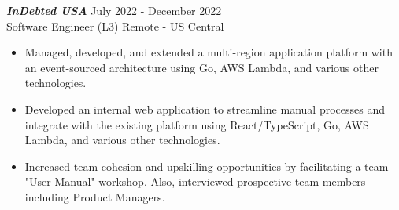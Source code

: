 {\sl \textbf{InDebted USA}} \hfill July 2022 - December 2022 \\ Software Engineer (L3) \hfill Remote - US Central
\begin{itemize}
    \item Managed, developed, and extended a multi-region application platform with an event-sourced architecture using Go, AWS Lambda, and various other technologies.
    \item Developed an internal web application to streamline manual processes and integrate with the existing platform using React/TypeScript, Go, AWS Lambda, and various other technologies.
    \item Increased team cohesion and upskilling opportunities by facilitating a team "User Manual" workshop. Also, interviewed prospective team members including Product Managers.
\end{itemize}
